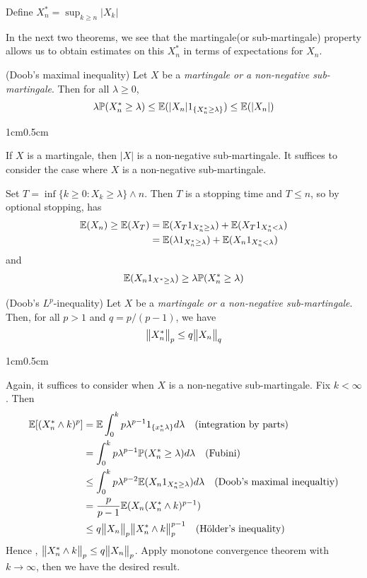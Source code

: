 \documentclass[12pt,a4paper]{report}
\newenvironment{proof}
{\begin{changemargin}{1cm}{0.5cm} 
	}%
	{\end{changemargin}
}
\begin{document}
\quad Define $X_n^* = \sup_{k\geq n} |X_k|$
\s

In the next two theorems, we see that the martingale(or sub-martingale) property allows us to obtain estimates on this $X_n^*$ in terms of expectations for $X_n$.\\
\s

 (Doob's maximal inequality) Let $X$ be a \emph{martingale or a non-negative sub-martingale}. Then for all $\lambda \geq 0$,
\begin{align*}
\lambda \mathbb{P}(X_n^* \geq \lambda) \leq \mathbb{E}(|X_n|   1_{\{ X_n^*\geq \lambda \}}) \leq \mathbb{E}(|X_n|)
\end{align*}
\begin{proof}
\pf If $X$ is a martingale, then $|X|$ is a non-negative sub-martingale. It suffices to consider the case where $X$ is a non-negative sub-martingale.

\quad Set $T = \inf \{ k \geq 0 : X_k \geq \lambda \} \wedge n$. Then $T$ is a stopping time and $T\leq n$, so by optional stopping, has
\begin{align*}
\mathbb{E}(X_n) \geq \mathbb{E}(X_T) &= \mathbb{E}(X_T 1_{X^*_n \geq \lambda}) + \mathbb{E}(X_T 1_{X^*_n < \lambda}) \\
& = \mathbb{E}( \lambda 1_{X^*_n \geq \lambda})  + \mathbb{E}(X_n 1_{X_n^* < \lambda})
\end{align*}
and
\begin{align*}
\mathbb{E}(X_n 1_{X^* \geq \lambda}) \geq \lambda \mathbb{P}(X^*_n \geq \lambda)
\end{align*}

\eop
\end{proof}
\s

 (Doob's $L^p$-inequality) Let $X$ be a \emph{martingale or a non-negative sub-martingale}. Then, for all $p>1$ and $q = p/(p-1)$, we have
\begin{align*}
\bigl\lVert X^*_n\bigr\rVert_{p} \leq q \bigl\lVert X_n\bigr\rVert_{q} 
\end{align*}
\begin{proof}
\pf Again, it suffices to consider when $X$ is a non-negative sub-martingale. Fix $k < \infty$. Then
\begin{align*}
\mathbb{E} [ (X^*_n \wedge k)^p  ] &= \mathbb{E} \int_0^k p \lambda^{p-1} 1_{\{x^*_n \lambda \}} d\lambda \quad \text{(integration by parts)}\\
& = \int_0^k p \lambda^{p-1} \mathbb{P}(X^*_n \geq \lambda) d\lambda \quad \text{(Fubini)} \\
& \leq \int_0^k p\lambda^{p-2} \mathbb{E} (X_n 1_{X^*_n \geq \lambda}) d\lambda \quad \text{(Doob's maximal inequaltiy)} \\
& =\frac{p}{p-1} \mathbb{E}(X_n (X^*_n \wedge k)^{p-1} ) \\
& \leq q \bigl\lVert X_n\bigr\rVert_{p} \bigl\lVert X^*_n \wedge k\bigr\rVert_{p}^{p-1} \quad \text{(H\"{o}lder's inequality)}
\end{align*}
Hence , $\bigl\lVert X^*_n \wedge k\bigr\rVert_{p} \leq q\bigl\lVert X_n\bigr\rVert_{p}$. Apply monotone convergence theorem with $k\rightarrow \infty$, then we have the desired result.

\eop
\end{proof}
\s
\end{document}
